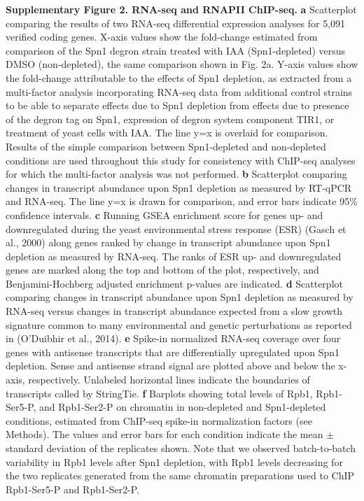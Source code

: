 \documentclass[9pt]{extarticle}
\begin{document}
\textbf{Supplementary Figure 2. RNA-seq and RNAPII ChIP-seq.}
\textbf{a} Scatterplot comparing the results of two RNA-seq differential expression analyses for 5,091 verified coding genes.
X-axis values show the fold-change estimated from comparison of the Spn1 degron strain treated with IAA (Spn1-depleted) versus DMSO (non-depleted), the same comparison shown in Fig. 2a.
Y-axis values show the fold-change attributable to the effects of Spn1 depletion, as extracted from a multi-factor analysis incorporating RNA-seq data from additional control strains to be able to separate effects due to Spn1 depletion from effects due to presence of the degron tag on Spn1, expression of degron system component TIR1, or treatment of yeast cells with IAA.
The line y=x is overlaid for comparison.
Results of the simple comparison between Spn1-depleted and non-depleted conditions are used throughout this study for consistency with ChIP-seq analyses for which the multi-factor analysis was not performed.
\textbf{b} Scatterplot comparing changes in transcript abundance upon Spn1 depletion as measured by RT-qPCR and RNA-seq. The line y=x is drawn for comparison, and error bars indicate 95\% confidence intervals.
\textbf{c} Running GSEA enrichment score for genes up- and downregulated during the yeast environmental stress response (ESR) (Gasch et al., 2000) along genes ranked by change in transcript abundance upon Spn1 depletion as measured by RNA-seq.
The ranks of ESR up- and downregulated genes are marked along the top and bottom of the plot, respectively, and Benjamini-Hochberg adjusted enrichment p-values are indicated.
\textbf{d} Scatterplot comparing changes in transcript abundance upon Spn1 depletion as measured by RNA-seq versus changes in transcript abundance expected from a slow growth signature common to many environmental and genetic perturbations as reported in (O'Duibhir et al., 2014). 
\textbf{e} Spike-in normalized RNA-seq coverage over four genes with antisense transcripts that are differentially upregulated upon Spn1 depletion.
Sense and antisense strand signal are plotted above and below the x-axis, respectively.
Unlabeled horizontal lines indicate the boundaries of transcripts called by StringTie.
\textbf{f} Barplots showing total levels of Rpb1, Rpb1-Ser5-P, and Rpb1-Ser2-P on chromatin in non-depleted and Spn1-depleted conditions, estimated from ChIP-seq spike-in normalization factors (see Methods).
The values and error bars for each condition indicate the mean $\pm$ standard deviation of the replicates shown.
Note that we observed batch-to-batch variability in Rpb1 levels after Spn1 depletion, with Rpb1 levels decreasing for the two replicates generated from the same chromatin preparations used to ChIP Rpb1-Ser5-P and Rpb1-Ser2-P.
\end{document}

